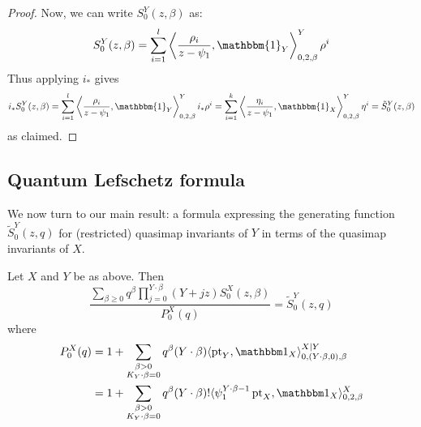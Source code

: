 \begin{proof}
\begin{comment}
where the last equality holds because $\gamma \in i^*\HH^*(X)^\perp$. So indeed $i_* \gamma = 0$ and so $i_* \rho_{k+1} = \ldots = i_* \rho_l = 0$. \end{comment}
Now, we can write $S_0^Y(z,\beta)$ as:
\begin{equation*} S_0^Y(z,\beta) = \sum_{i=1}^l \left\langle \dfrac{\rho_i}{z-\psi_1} , \mathbbm{1}_Y \right\rangle_{0,2,\beta}^Y  \rho^i \end{equation*}
Thus applying $i_*$ gives
\begin{align*} i_* S_0^Y(z,\beta)  = \sum_{i=1}^l \left\langle \dfrac{\rho_i}{z-\psi_1} , \mathbbm{1}_Y \right\rangle_{0,2,\beta}^Y   i_* \rho^i
= \sum_{i=1}^k \left\langle \dfrac{\eta_i}{z-\psi_1}, \mathbbm{1}_X \right\rangle_{0,2,\beta}^Y   \eta^i = \tilde{S}_0^Y(z,\beta) \end{align*}
as claimed. \end{proof}


\subsection{Quantum Lefschetz formula} We now turn to our main result: a formula expressing the generating function $\tilde{S}_0^Y(z,q)$ for (restricted) quasimap invariants of $Y$ in terms of the quasimap invariants of $X$.

\begin{thm} \label{Theorem Quantum Lefschetz}
Let $X$ and $Y$ be as above. Then
\begin{equation}\label{eqn:mirror}
\dfrac{\sum_{\beta\geq 0} q^\beta\prod_{j=0}^{Y\cdot\beta}(Y+jz)S_0^X(z,\beta)}{P_0^X(q)}= \tilde{S}_0^Y(z,q)
\end{equation}
where
\begin{align*}
 P_0^X(q) & = 1 + \sum_{\substack{\beta>0 \\ K_Y\cdot\beta=0}} q^\beta (Y\cdot\beta) \langle \pt_Y,\mathbbm 1_{X}\rangle_{0,(Y\cdot\beta,0),\beta}^{X|Y} \\
& = 1 + \sum_{\substack{\beta>0 \\ K_Y\cdot\beta=0}} q^\beta(Y\cdot\beta)!\langle\psi_1^{Y\cdot\beta-1} \pt_X,\mathbbm 1_{X}\rangle_{0,2,\beta}^X
\end{align*}
\end{thm}

